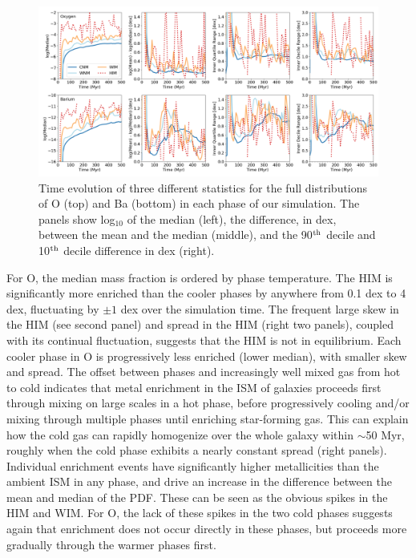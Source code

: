 \begin{figure}
\centering
\includegraphics[width=0.95\linewidth]{figures/ch3/O_Ba_distribution_evolution}
\caption{Time evolution of three different statistics for the full distributions of O (top) and Ba (bottom) in each phase of our simulation. The panels show log$_{10}$ of the median (left), the difference, in dex, between the mean and the median (middle), and the 90$^{\rm th}$ decile and 10$^{\rm th}$ decile difference in dex (right).}
\label{fig:phase-statistics}
\end{figure}

For O, the median mass fraction is ordered by phase temperature. The HIM is significantly more enriched than the cooler phases by anywhere from 0.1 dex to 4 dex, fluctuating by $\pm 1$ dex over the simulation time. The frequent large skew in the HIM (see second panel) and spread in the HIM (right two panels), coupled with its continual fluctuation, suggests that the HIM is not in equilibrium.
Each cooler phase in O is progressively less enriched (lower median), with smaller skew and spread. The offset between phases and increasingly well mixed gas from hot to cold indicates that metal enrichment in the ISM of galaxies proceeds first through mixing on large scales in a hot phase, before progressively cooling and/or mixing through multiple phases until enriching star-forming gas. This 
    can explain
how the cold gas can rapidly homogenize over the whole galaxy within $\sim$50 Myr, roughly when the cold phase exhibits a nearly constant spread (right panels). Individual enrichment events 
have significantly higher metallicities than the ambient ISM in any phase, and 
drive an increase in the difference between the mean and median of the PDF. These can be seen as the obvious spikes in the HIM and WIM. For O, the lack of these spikes in the two cold phases suggests again that enrichment does not occur directly in these phases, but proceeds more gradually through the warmer phases first.


